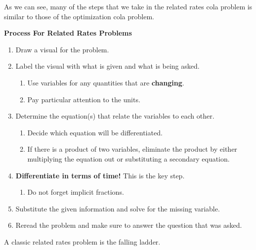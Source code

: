 As we can see, many of the steps that we take in the related rates cola problem is similar to those of the optimization cola problem. 

\textbf{Process For Related Rates Problems} \par

\begin{enumerate}[label=\arabic*.]
    \item Draw a visual for the problem. 
    \item Label the visual with what is given and what is being asked. 
    \begin{enumerate}[label=\alph*.]
        \item Use variables for any quantities that are \textbf{changing}. 
        \item Pay particular attention to the units.
    \end{enumerate}
    \item Determine the equation(s) that relate the variables to each other.
    \begin{enumerate}[label=\alph*.]
        \item Decide which equation will be differentiated.
        \item If there is a product of two variables, eliminate the product by either multiplying the equation out or substituting a secondary equation.
    \end{enumerate}
    \item \textbf{Differentiate in terms of time!} This is the key step.
    \begin{enumerate}[label=\alph*.]
        \item Do not forget implicit fractions.
    \end{enumerate}
    \item Substitute the given information and solve for the missing variable.
    \item Reread the problem and make sure to answer the question that was asked.
\end{enumerate} \vspace{11pt}

A classic related rates problem is the falling ladder. 


